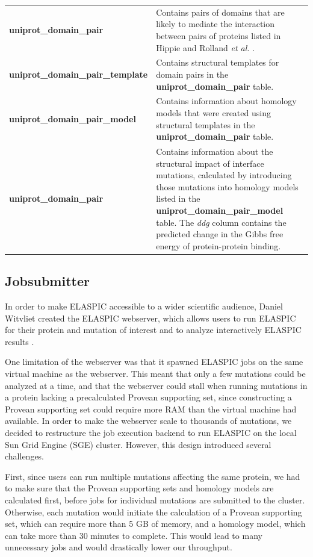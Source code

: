 \begin{table}[!tb]
\begin{tabular}{l | p{10cm}}
	\textbf{uniprot\_domain\_pair} & Contains pairs of domains that are likely to mediate the interaction between pairs of proteins listed in Hippie \cite{schaefer_hippie:_2012} and Rolland \textit{et al.} \cite{rolland_proteome-scale_2014}. \\
	\textbf{uniprot\_domain\_pair\_template} & Contains structural templates for domain pairs in the \textbf{uniprot\_domain\_pair} table. \\
	\textbf{uniprot\_domain\_pair\_model} & Contains information about homology models that were created using structural templates in the \textbf{uniprot\_domain\_pair} table. \\
	\textbf{uniprot\_domain\_pair} & Contains information about the structural impact of interface mutations, calculated by introducing those mutations into homology models listed in the \textbf{uniprot\_domain\_pair\_model} table. The \textit{ddg} column contains the predicted change in the Gibbs free energy of protein-protein binding. \\
	\bottomrule
\end{tabular}
\end{table}


\clearpage
\subsection{Jobsubmitter}

In order to make ELASPIC accessible to a wider scientific audience, Daniel Witvliet created the ELASPIC webserver, which allows users to run ELASPIC for their protein and mutation of interest and to analyze interactively ELASPIC results \cite{witvliet_elaspic_2016}.

One limitation of the webserver was that it spawned ELASPIC jobs on the same virtual machine as the webserver. This meant that only a few mutations could be analyzed at a time, and that the webserver could stall when running mutations in a protein lacking a precalculated Provean supporting set, since constructing a Provean supporting set could require more RAM than the virtual machine had available. In order to make the webserver scale to thousands of mutations, we decided to restructure the job execution backend to run ELASPIC on the local Sun Grid Engine (SGE) cluster. However, this design introduced several challenges.

First, since users can run multiple mutations affecting the same protein, we had to make sure that the Provean supporting sets and homology models are calculated first, before jobs for individual mutations are submitted to the cluster. Otherwise, each mutation would initiate the calculation of a Provean supporting set, which can require more than 5 GB of memory, and a homology model, which can take more than 30 minutes to complete. This would lead to many unnecessary jobs and would drastically lower our throughput.

